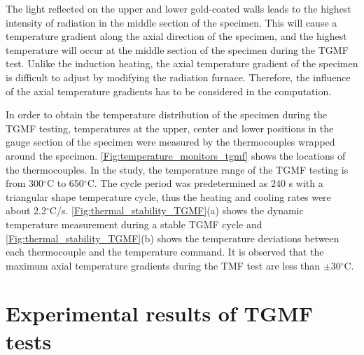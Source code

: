 \documentclass[preprint,5p,twocolumn,11pt,sort&compress]{elsarticle}
\begin{document}
The light reflected on the upper and lower gold-coated walls leads to the highest intensity of radiation in the middle section of the specimen.
This will cause a temperature gradient along the axial direction of the specimen, and the highest temperature will occur at the middle section of the specimen during the TGMF test.
Unlike the induction heating, the axial temperature gradient of the specimen is difficult to adjust by modifying the radiation furnace.
Therefore, the influence of the axial temperature gradients has to be considered in the computation.

In order to obtain the temperature distribution of the specimen during the TGMF testing, temperatures at the upper, center and lower positions in the gauge section of the specimen were measured by the thermocouples wrapped around the specimen. \autoref{Fig:temperature_monitors_tgmf} shows the locations of the thermocouples. In the study, the temperature range of the TGMF testing is from 300$^\circ$C to 650$^\circ$C. The cycle period was predetermined as 240 s with a triangular shape temperature cycle, thus the heating and cooling rates were about 2.2$^\circ$C/s.
\autoref{Fig:thermal_stability_TGMF}(a) shows the dynamic temperature measurement during a stable TGMF cycle and \autoref{Fig:thermal_stability_TGMF}(b) shows the temperature deviations between each thermocouple and the temperature command.
It is observed that the maximum axial temperature gradients during the TMF test are less than $\pm30$$^\circ$C.






\section{Experimental results of TGMF tests}
\end{document}
